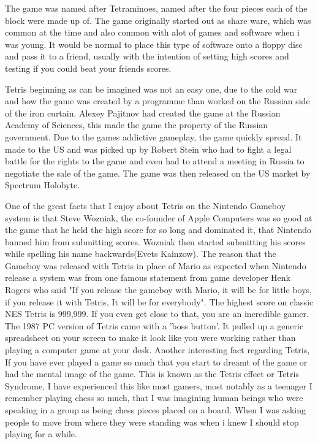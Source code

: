 \documentclass{article}
\begin{document}
The game was named after Tetraminoes, named after the four pieces each of the block were made up of. The game originally started out as share ware, which was common at the time and also common with alot of games and software when i was young. It would be normal to place this type of software onto a floppy disc and pass it to a friend, usually with the intention of setting high scores and testing if you could beat your friends scores. \newline

Tetris beginning as can be imagined was not an easy one, due to the cold war and how the game was created by a programme than worked on the Russian side of the iron curtain. Alexey Pajitnov had created the game at the Russian Academy of Sciences, this made the game the property of the Russian government. Due to the games addictive gameplay, the game quickly spread. It made to the US and was picked up by Robert Stein who had to fight a legal battle for the rights to the game and even had to attend a meeting in Russia to negotiate the sale of the game. The game was then released on the US market by Spectrum Holobyte. \newline

One of the great facts that I enjoy about Tetris on the Nintendo Gameboy system is that Steve Wozniak, the co-founder of Apple Computers was so good at the game that he held the high score for so long and dominated it, that Nintendo banned him from submitting scores. Wozniak then started submitting his scores while spelling his name backwards(Evets Kainzow). The reason that the Gameboy was released with Tetris in place of Mario as expected when Nintendo release a system was from one famous statement from game developer Henk Rogers who said "If you release the gameboy with Mario, it will be for little boys, if you release it with Tetris, It will be for everybody". The highest score on classic NES Tetris is 999,999. If you even get close to that, you are an incredible gamer. The 1987 PC version of Tetris came with a 'boss button'. It pulled up a generic spreadsheet on your screen to make it look like you were working rather than playing a computer game at your desk. \newline
Another interesting fact regarding Tetris, If you have ever played a game so much that you start to dreamt of the game or had the mental image of the game. This is known as the Tetris effect or Tetris Syndrome, I have experienced this like most gamers, most notably as a teenager I remember playing chess so much, that I was imagining human beings who were speaking in a group as being chess pieces placed on a board. When I was asking people to move from where they were standing was when i knew I should stop playing for a while. \newline
\end{document}
